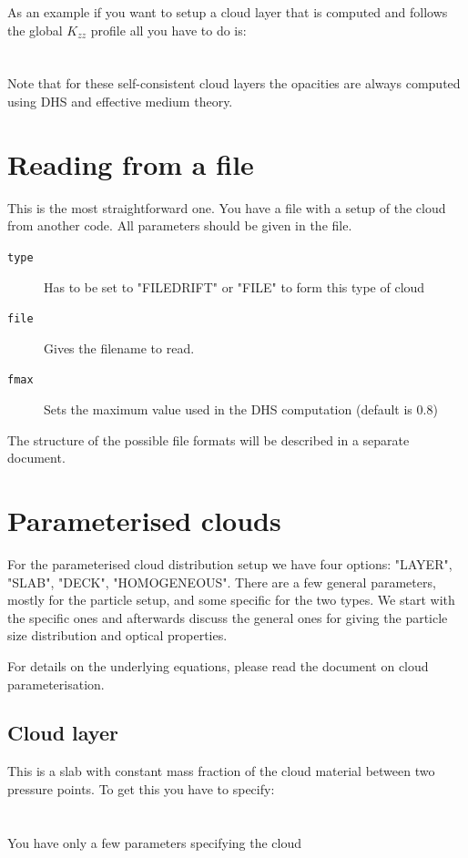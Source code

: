 \documentclass[12pt]{article}
\begin{document}
As an example if you want to setup a cloud layer that is computed and follows the global $K_{zz}$ profile all you have to do is:
\\
\\
\\
Note that for these self-consistent cloud layers the opacities are always computed using DHS and effective medium theory.

\section{Reading from a file}

This is the most straightforward one. You have a file with a setup of the cloud from another code. All parameters should be given in the file.

\begin{description}
\item[\texttt{type}]
Has to be set to "FILEDRIFT" or "FILE" to form this type of cloud
\item[\texttt{file}]
Gives the filename to read.
\item[\texttt{fmax}]
Sets the maximum value used in the DHS computation (default is 0.8)
\end{description}
The structure of the possible file formats will be described in a separate document.

\section{Parameterised clouds}

For the parameterised cloud distribution setup we have four options: "LAYER", "SLAB", "DECK", "HOMOGENEOUS".
There are a few general parameters, mostly for the particle setup, and some specific for the two types. We start with the specific ones and afterwards discuss the general ones for giving the particle size distribution and optical properties.

For details on the underlying equations, please read the document on cloud parameterisation.

\subsection{Cloud layer}

This is a slab with constant mass fraction of the cloud material between two pressure points. To get this you have to specify:
\\
\\
\\
You have only a few parameters specifying the cloud
\end{document}
